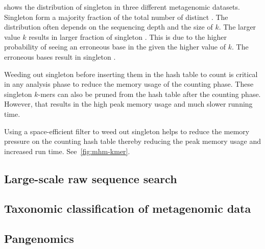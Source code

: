 shows the distribution of singleton \kmers in three
different metagenomic datasets. Singleton \kmers form a majority fraction of
the total number of distinct \kmers. The distribution often depends on the
sequencing depth and the size of $k$. The larger value $k$ results in larger
fraction of singleton \kmers. This is due to the higher probability of seeing
an erroneous base in the \kmer given the higher value of $k$. The erroneous
bases result in singleton \kmers.

Weeding out singleton \kmers before inserting them in the hash table to count
is critical in any \kmer analysis phase to reduce the memory usage of the
counting phase. These singleton $k$-mers can also be pruned from the hash table
after the counting phase. However, that results in the high peak memory usage
and much slower running time.

Using a space-efficient filter to weed out singleton \kmers helps to reduce
the memory pressure on the counting hash table thereby reducing the peak memory
usage and increased run time. See~\cref{fig:mhm-kmer}.


\subsection{Large-scale raw sequence search}

\subsection{Taxonomic classification of metagenomic data}

\subsection{Pangenomics}

